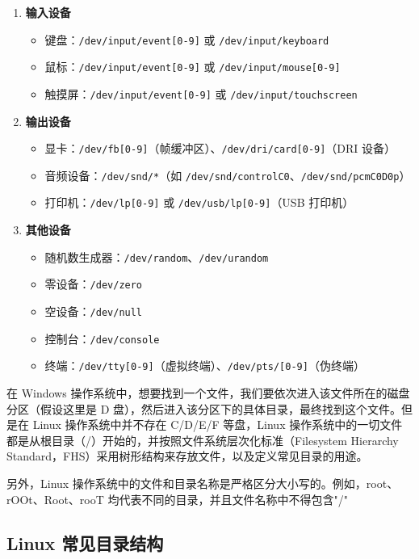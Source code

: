 \documentclass[12pt,UTF8]{ctexbook}
\begin{document}
\begin{enumerate}
    \item \textbf{输入设备}
    \begin{itemize}
        \item 键盘：\verb+/dev/input/event[0-9]+ 或 \verb+/dev/input/keyboard+
        \item 鼠标：\verb+/dev/input/event[0-9]+ 或 \verb+/dev/input/mouse[0-9]+
        \item 触摸屏：\verb+/dev/input/event[0-9]+ 或 \verb+/dev/input/touchscreen+
    \end{itemize}

    \item \textbf{输出设备}
    \begin{itemize}
        \item 显卡：\verb+/dev/fb[0-9]+（帧缓冲区）、\verb+/dev/dri/card[0-9]+（DRI 设备）
        \item 音频设备：\verb+/dev/snd/*+（如 \verb+/dev/snd/controlC0+、\verb+/dev/snd/pcmC0D0p+）
        \item 打印机：\verb+/dev/lp[0-9]+ 或 \verb+/dev/usb/lp[0-9]+（USB 打印机）
    \end{itemize}

    \item \textbf{其他设备}
    \begin{itemize}
        \item 随机数生成器：\verb+/dev/random+、\verb+/dev/urandom+
        \item 零设备：\verb+/dev/zero+
        \item 空设备：\verb+/dev/null+
        \item 控制台：\verb+/dev/console+
        \item 终端：\verb+/dev/tty[0-9]+（虚拟终端）、\verb+/dev/pts/[0-9]+（伪终端）
    \end{itemize}
\end{enumerate}

在 Windows 操作系统中，想要找到一个文件，我们要依次进入该文件所在的磁盘分区（假设这里是 D 盘），然后进入该分区下的具体目录，最终找到这个文件。但是在 Linux 操作系统中并不存在 C/D/E/F 等盘，Linux 操作系统中的一切文件都是从根目录（/）开始的，并按照文件系统层次化标准（Filesystem Hierarchy Standard，FHS）采用树形结构来存放文件，以及定义常见目录的用途。

另外，Linux 操作系统中的文件和目录名称是严格区分大小写的。例如，root、rOOt、Root、rooT 均代表不同的目录，并且文件名称中不得包含"/"

\subsection{Linux 常见目录结构}
\end{document}

